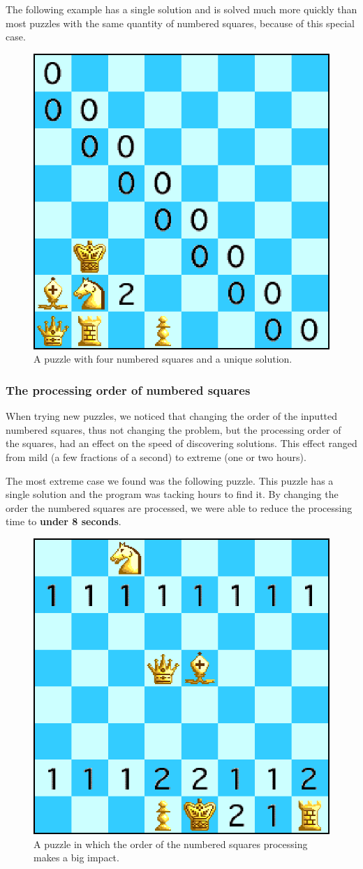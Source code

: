 \documentclass[runningheads]{llncs}
\begin{document}
The following example has a single solution and is solved much more quickly
than most puzzles with the same quantity of numbered squares, because of this
special case.

\begin{figure}[H]
  \centering
  \includegraphics[width=0.4\linewidth]{figures/chess8.eps}
  \caption{A puzzle with four numbered squares and a unique solution.}\label{fig:fig6}
\end{figure}

\subsubsection{The processing order of numbered squares}
When trying new puzzles, we noticed that changing the order of the inputted
numbered squares, thus not changing the problem, but the processing order
of the squares, had an effect on the speed of discovering solutions. This
effect ranged from mild (a few fractions of a second) to extreme (one or two
hours).

The most extreme case we found was the following puzzle. This puzzle has a single
solution and the program was tacking hours to find it. By changing the order
the numbered squares are processed, we were able to reduce the processing time
to \textbf{under 8 seconds}.

\begin{figure}[H]
  \centering
  \includegraphics[width=0.4\linewidth]{figures/chess7.eps}
  \caption{A puzzle in which the order of the numbered squares processing makes a big impact.}\label{fig:fig7}
\end{figure}
\end{document}
